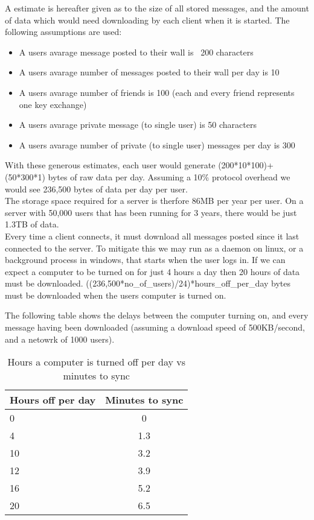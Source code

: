 A estimate is hereafter given as to the size of all stored messages, and the
amount of data which would need downloading by each client when it is started.
The following assumptions are used:
\begin{itemize}
\item A users avarage message posted to their wall is ~200 characters
\item A users avarage number of messages posted to their wall per day is 10
\item A users avarage number of friends is 100 (each and every friend represents
one key exchange)
\item A users avarage private message (to single user) is 50 characters
\item A users avarage number of private (to single user) messages per day is 300
\end{itemize}
With these generous estimates, each user would generate (200*10*100)+(50*300*1)
bytes of raw data per day. Assuming a 10\% protocol overhead we would see
236,500 bytes of data per day per user.\\

The storage space required for a server is therfore 86MB per year per user. On a
server with 50,000 users that has been running for 3 years, there would be just
1.3TB of data.\\

Every time a client connects, it must download all messages posted since it last
connected to the server. To mitigate this we may run as a daemon on linux, or a
background process in windows, that starts when the user logs in. If we can
expect a computer to be turned on for just 4 hours a day then 20 hours of data
must be downloaded. ((236,500*no\_of\_users)/24)*hours\_off\_per\_day bytes must be
downloaded when the users computer is turned on.

The following table shows the delays between the computer turning on, and every
message having been downloaded (assuming a download speed of 500KB/second, and a
netowrk of 1000 users).

\begin{table}[h]
    \centering
    \begin{tabular}{lc}
    Hours off per day & Minutes to sync       \\ \hline
    0                 &  0 \\
    4                 &  1.3\\
    10                &  3.2\\
    12                &  3.9\\
    16                &  5.2\\
    20                &  6.5\\
    \end{tabular}
    \caption{Hours a computer is turned off per day vs minutes to sync}
\end{table}

